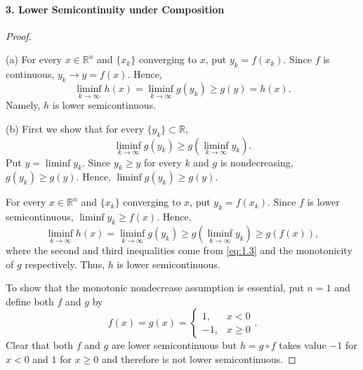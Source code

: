  \paragraph{3. Lower Semicontinuity under Composition}
  \begin{proof}
    $\,$\par
    (a) For every $x\in\mathbb{R}^n$ and $\{x_k\}$ converging to $x$, put $y_k
    =f(x_k)$. Since $f$ is continuous, $y_k\to y=f(x)$. Hence,
    \[
      \liminf_{k\to\infty}h(x)=\liminf_{k\to\infty}g(y_k)\ge g(y)=h(x).
    \]
    Namely, $h$ is lower semicontinuous.\par
    (b) First we show that for every $\{y_k\}\subset\mathbb{R}$, 
    \begin{equation}
      \label{eq:1.3}
      \liminf_{k\to\infty}g(y_k) \ge g\left(\liminf_{k\to\infty}y_k\right).
    \end{equation}
    Put $y=\liminf y_k$. Since $y_k\ge y$ for every $k$ and $g$ is 
    nondecreasing, $g(y_k)\ge g(y)$. Hence, $\liminf g(y_k)\ge g(y)$.\par
    For every $x\in\mathbb{R}^n$ and $\{x_k\}$ converging to $x$, put $y_k=f
    (x_k)$. Since $f$ is lower semicontinuous, $\liminf y_k\ge f(x)$. Hence,
    \[
      \liminf_{k\to\infty}h(x)=
      \liminf_{k\to\infty}g(y_k)\ge
      g\left(\liminf_{k\to\infty}y_k\right)\ge
      g(f(x)),
    \]
    where the second and third inequalities come from \eqref{eq:1.3} and the
    monotonicity of $g$ respectively. Thus, $h$ is lower semicontinuous.\par
    To show that the monotonic nondecrease assumption is essential, put $n=1$
    and define both $f$ and $g$ by
    \[
      f(x)=g(x)=\begin{cases}
        1, & x<0 \\
        -1,& x\ge 0
      \end{cases}.
    \]
    Clear that both $f$ and $g$ are lower semicontinuous but $h=g\circ f$ takes
    value $-1$ for $x<0$ and $1$ for $x\ge 0$ and therefore is not lower 
    semicontinuous.
  \end{proof}
  
